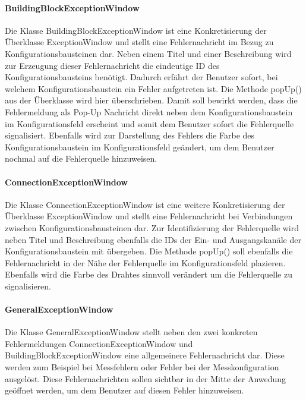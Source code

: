 \documentclass[parskip=full]{scrartcl}
\begin{document}
\paragraph{BuildingBlockExceptionWindow}

Die Klasse BuildingBlockExceptionWindow ist eine Konkretisierung der Überklasse ExceptionWindow und stellt eine Fehlernachricht im Bezug zu Konfigurationsbausteinen dar. Neben einem Titel und einer Beschreibung wird zur Erzeugung dieser Fehlernachricht die eindeutige ID des Konfigurationsbausteins benötigt. Dadurch erfährt der Benutzer sofort, bei welchem Konfigurationsbaustein ein Fehler aufgetreten ist. Die Methode popUp() aus der Überklasse wird hier überschrieben. Damit soll bewirkt werden, dass die Fehlermeldung als Pop-Up Nachricht direkt neben dem Konfigurationsbaustein im Konfigurationsfeld erscheint und somit dem Benutzer sofort die Fehlerquelle signalisiert. Ebenfalls wird zur Darstellung des Fehlers die Farbe des Konfigurationsbaustein im Konfigurationsfeld geändert, um dem Benutzer nochmal auf die Fehlerquelle hinzuweisen.

\paragraph{ConnectionExceptionWindow}

Die Klasse ConnectionExceptionWindow ist eine weitere Konkretisierung der Überklasse ExceptionWindow und stellt eine Fehlernachricht bei Verbindungen zwischen Konfigurationsbausteinen dar. Zur Identifizierung der Fehlerquelle wird neben Titel und Beschreibung ebenfalls die IDs der Ein- und Ausgangskanäle der Konfigurationsbaustein mit übergeben. Die Methode popUp() soll ebenfalls die Fehlernachricht in der Nähe der Fehlerquelle im Konfigurationsfeld plazieren. Ebenfalls wird die Farbe des Drahtes sinnvoll verändert um die Fehlerquelle zu signalisieren.

\paragraph{GeneralExceptionWindow}

Die Klasse GeneralExceptionWindow stellt neben den zwei konkreten Fehlermeldungen ConnectionExceptionWindow und BuildingBlockExceptionWindow eine allgemeinere Fehlernachricht dar. Diese werden zum Beispiel bei Messfehlern oder Fehler bei der Messkonfiguration ausgelöst. Diese Fehlernachrichten sollen sichtbar in der Mitte der Anwedung geöffnet werden, um dem Benutzer auf diesen Fehler hinzuweisen. 
\end{document}
